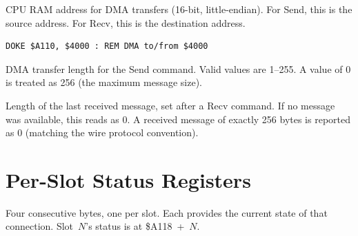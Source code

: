 

CPU RAM address for DMA transfers (16-bit, little-endian).  For Send, this is
the source address.  For Recv, this is the destination address.

\begin{lstlisting}
DOKE $A110, $4000 : REM DMA to/from $4000
\end{lstlisting}



DMA transfer length for the Send command.  Valid values are 1--255.  A value of
0 is treated as 256 (the maximum message size).



Length of the last received message, set after a Recv command.  If no message
was available, this reads as 0.  A received message of exactly 256 bytes is
reported as 0 (matching the wire protocol convention).


\section{Per-Slot Status Registers}
\label{sec:nic-slot-status}



Four consecutive bytes, one per slot.  Each provides the current state of that
connection.  Slot~$N$'s status is at \$A118~+~$N$.


